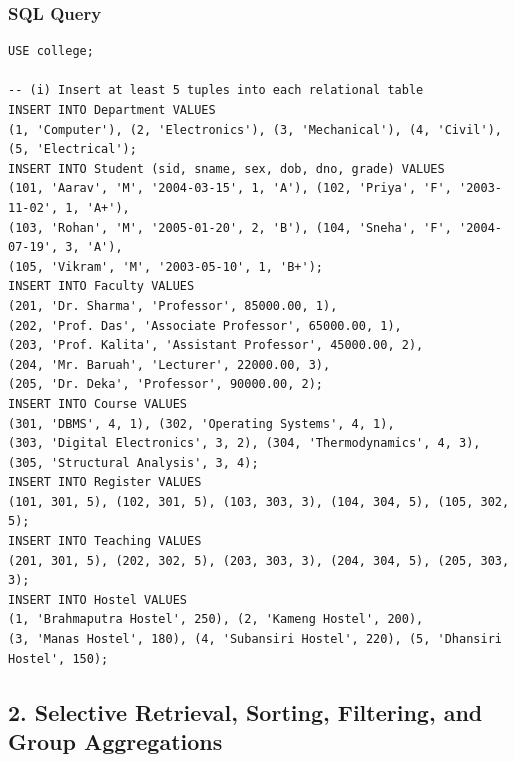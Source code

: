 \subsubsection*{SQL Query}
\begin{lstlisting}[basicstyle=\ttfamily\footnotesize,caption={Populating sample records into all college database tables}]
USE college;

-- (i) Insert at least 5 tuples into each relational table
INSERT INTO Department VALUES
(1, 'Computer'), (2, 'Electronics'), (3, 'Mechanical'), (4, 'Civil'), (5, 'Electrical');
INSERT INTO Student (sid, sname, sex, dob, dno, grade) VALUES
(101, 'Aarav', 'M', '2004-03-15', 1, 'A'), (102, 'Priya', 'F', '2003-11-02', 1, 'A+'),
(103, 'Rohan', 'M', '2005-01-20', 2, 'B'), (104, 'Sneha', 'F', '2004-07-19', 3, 'A'),
(105, 'Vikram', 'M', '2003-05-10', 1, 'B+');
INSERT INTO Faculty VALUES
(201, 'Dr. Sharma', 'Professor', 85000.00, 1),
(202, 'Prof. Das', 'Associate Professor', 65000.00, 1),
(203, 'Prof. Kalita', 'Assistant Professor', 45000.00, 2),
(204, 'Mr. Baruah', 'Lecturer', 22000.00, 3),
(205, 'Dr. Deka', 'Professor', 90000.00, 2);
INSERT INTO Course VALUES
(301, 'DBMS', 4, 1), (302, 'Operating Systems', 4, 1),
(303, 'Digital Electronics', 3, 2), (304, 'Thermodynamics', 4, 3),
(305, 'Structural Analysis', 3, 4);
INSERT INTO Register VALUES
(101, 301, 5), (102, 301, 5), (103, 303, 3), (104, 304, 5), (105, 302, 5);
INSERT INTO Teaching VALUES
(201, 301, 5), (202, 302, 5), (203, 303, 3), (204, 304, 5), (205, 303, 3);
INSERT INTO Hostel VALUES
(1, 'Brahmaputra Hostel', 250), (2, 'Kameng Hostel', 200),
(3, 'Manas Hostel', 180), (4, 'Subansiri Hostel', 220), (5, 'Dhansiri Hostel', 150);
\end{lstlisting}

\newpage

\subsection*{2. Selective Retrieval, Sorting, Filtering, and Group Aggregations}

